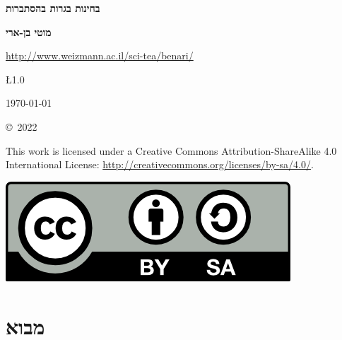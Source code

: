 

\thispagestyle{empty}

\begin{center}
\textbf{\LARGE בחינות בגרות בהסתברות}
\end{center}

\bigskip
\bigskip

\begin{center}
\textbf{\Large מוטי בן-ארי}

\bigskip

\url{http://www.weizmann.ac.il/sci-tea/benari/}
\end{center}

\begin{center}	
\begin{bfseries}
\bigskip
\bigskip

 \L{1.0} 

\bigskip

\today

\end{bfseries}
\end{center}

\vfill


\begin{small}
\begin{center}
\copyright{}\ 2022 
\end{center}

This work is licensed under a Creative Commons Attribution-ShareAlike 4.0 International License:
\url{http://creativecommons.org/licenses/by-sa/4.0/}.
\end{small}

\bigskip

\begin{center}
\includegraphics[width=.2\textwidth]{../by-sa.png}
\end{center}

\newpage


\thispagestyle{empty}

\tableofcontents

\newpage

\section*{מבוא}

